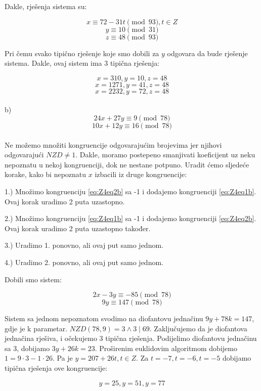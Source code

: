 \documentclass[12pt]{article}
\begin{document}
Dakle, rješenja sistema su:

$$x \equiv 72 - 31t \pmod{93}, t \in Z$$
$$y \equiv 10 \pmod{31}$$
$$z \equiv 48 \pmod{93}$$\vspace{1mm}

Pri čemu svako tipično rješenje koje smo dobili za $y$ odgovara da bude rješenje sistema. Dakle, ovaj sistem ima 3 tipična rješenja:

$$x = 310, y = 10, z = 48$$ 
$$x = 1271, y = 41, z = 48$$
$$x = 2232, y = 72, z = 48$$\vspace{1mm}
\\
b)
\[
24x + 27y \equiv 9 \pmod{78} \label{eq:Z4eq1b} \tag{1}
\]
\[
10x + 12y \equiv 16 \pmod{78} \label{eq:Z4eq2b} \tag{2}
\]
\\

Ne možemo množiti kongruencije odgovarajućim brojevima jer njihovi odgovarajući $NZD \neq 1$. Dakle, moramo postepeno smanjivati koeficijent uz neku nepoznatu u nekoj kongruenciji, dok ne nestane potpuno. Uradit ćemo sljedeće korake, kako bi nepoznatu $x$ izbacili iz druge kongruencije:\vspace{1mm}

\begin{center}
1.) Množimo kongruenciju \ref{eq:Z4eq2b} sa -1 i dodajemo kongruenciji \ref{eq:Z4eq1b}. Ovaj korak uradimo 2 puta uzastopno.


2.) Množimo kongruenciju \ref{eq:Z4eq1b} sa -1 i dodajemo kongruenciji \ref{eq:Z4eq2b}. Ovaj korak uradimo 2 puta uzastopno također.


3.) Uradimo 1. ponovno, ali ovaj put samo jednom.


4.) Uradimo 2. ponovno, ali ovaj put samo jednom.
\end{center}

Dobili smo sistem:

$$2x - 3y \equiv -85 \pmod{78}$$
$$9y \equiv 147 \pmod{78}$$\vspace{1mm}

Sistem sa jednom nepoznatom svodimo na diofantovu jednačinu $9y + 78k = 147$, gdje je k parametar. $NZD(78, 9) = 3 \land 3 \mid 69$. Zaključujemo da je diofantova jednačina rješiva, i očekujemo 3 tipična rješenja. Podijelimo diofantovu jednačinu sa 3, dobijamo $3y + 26k = 23$. Proširenim euklidovim algoritmom dobijemo $1 = 9 \cdot 3 - 1 \cdot 26$. Pa je $y = 207 + 26t, t \in Z$. Za $t = -7, t = -6, t = -5$ dobijamo tipična rješenja ove kongruencije:

$$y = 25, y = 51, y = 77$$\vspace{1mm}
\end{document}

